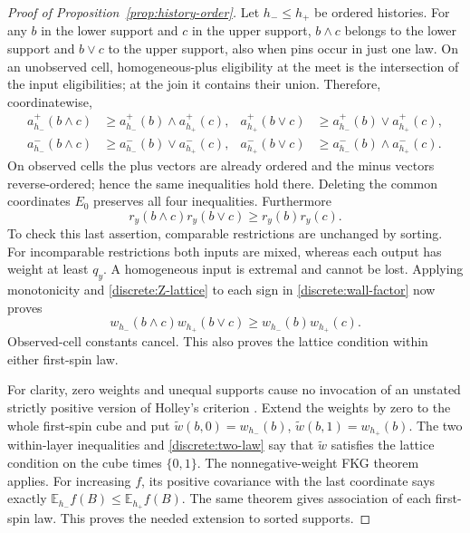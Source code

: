 \documentclass[11pt]{article}
\newcommand{\E}{\mathbb E}
\theoremstyle{definition}
\theoremstyle{remark}
\numberwithin{equation}{section}
\begin{document}
\begin{proof}[Proof of Proposition~\ref{prop:history-order}]
Let $h_-\le h_+$ be ordered histories. For any $b$ in the lower support and
$c$ in the upper support, $b\wedge c$ belongs to the lower support and
$b\vee c$ to the upper support, also when pins occur in just one law.
On an unobserved cell, homogeneous-plus eligibility at the meet is the
intersection of the input eligibilities; at the join it contains their
union. Therefore, coordinatewise,
\begin{align*}
 a_{h_-}^+(b\wedge c)&\ge a_{h_-}^+(b)\wedge a_{h_+}^+(c),&
 a_{h_+}^+(b\vee c)&\ge a_{h_-}^+(b)\vee a_{h_+}^+(c),\\
 a_{h_-}^-(b\wedge c)&\ge a_{h_-}^-(b)\vee a_{h_+}^-(c),&
 a_{h_+}^-(b\vee c)&\ge a_{h_-}^-(b)\wedge a_{h_+}^-(c).
\end{align*}
On observed cells the plus vectors are already ordered and the minus
vectors reverse-ordered; hence the same inequalities hold there. Deleting
the common coordinates $E_0$ preserves all four inequalities.
Furthermore
\[
 r_y(b\wedge c)r_y(b\vee c)\ge r_y(b)r_y(c).
\]
To check this last assertion, comparable restrictions are unchanged by
sorting. For incomparable restrictions both inputs are mixed, whereas
each output has weight at least $q_y$. A homogeneous input is extremal
and cannot be lost. Applying monotonicity and
\eqref{discrete:Z-lattice} to each sign in
\eqref{discrete:wall-factor} now proves
\begin{equation}\label{discrete:two-law}
 w_{h_-}(b\wedge c)w_{h_+}(b\vee c)
       \ge w_{h_-}(b)w_{h_+}(c).
\end{equation}
Observed-cell constants cancel. This also proves the lattice condition
within either first-spin law.

For clarity, zero weights and unequal supports cause no invocation of an
unstated strictly positive version of Holley's criterion
\cite{Holley1974}. Extend the weights by zero to the whole first-spin cube
and put $\widetilde w(b,0)=w_{h_-}(b)$,
$\widetilde w(b,1)=w_{h_+}(b)$. The two within-layer inequalities and
\eqref{discrete:two-law} say that $\widetilde w$ satisfies the lattice
condition on the cube times $\{0,1\}$. The nonnegative-weight FKG theorem
\cite{FKG1971} applies. For increasing $f$, its positive covariance with
the last coordinate says exactly
$\E_{h_-}f(B)\le\E_{h_+}f(B)$. The same theorem gives association of
each first-spin law. This proves the needed extension to sorted supports.


\end{proof}
\end{document}
